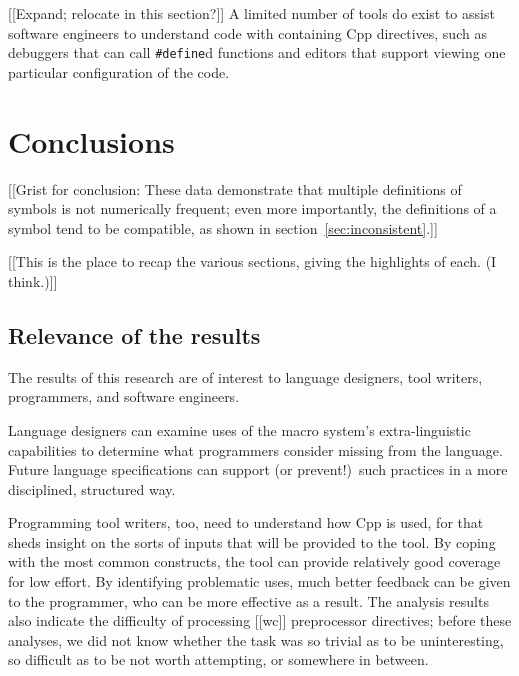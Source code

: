 \documentclass[10pt]{article}
\begin{document}



[[Expand; relocate in this section?]]
A limited number of tools do exist to assist software engineers to
understand code with containing Cpp directives, such as debuggers that can
call {\tt \#define}d functions and editors that support viewing one
particular configuration of the code.




\section{Conclusions}
\label{sec:conclusion}

[[Grist for conclusion: These data demonstrate that multiple definitions of
symbols is not numerically frequent; even more importantly, the definitions
of a symbol tend to be compatible, as shown in
section~\ref{sec:inconsistent}.]]


[[This is the place to recap the various sections, giving the highlights of
each.  (I think.)]]

\subsection{Relevance of the results}

The results of this research are of interest to language designers, tool
writers, programmers, and software engineers.

Language designers can examine uses of the macro system's extra-linguistic
capabilities to determine what programmers consider missing from the
language.  Future language specifications can support (or prevent!)\ such
practices in a more disciplined, structured way.


Programming tool writers, too, need to understand how Cpp is used, for that
sheds insight on the sorts of inputs that will be provided to the tool.  By
coping with the most common constructs, the tool can provide relatively
good coverage for low effort.  By identifying problematic uses, much better
feedback can be given to the programmer, who can be more effective as a
result.  The analysis results also indicate the difficulty of processing [[wc]]
preprocessor directives; before these analyses, we did not know whether the
task was so trivial as to be uninteresting, so difficult as to be not worth
attempting, or somewhere in between.
\end{document}
